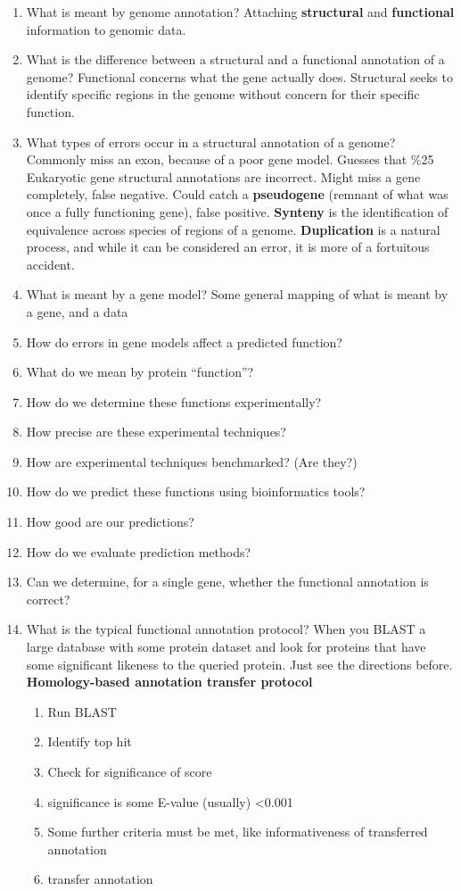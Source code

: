 \documentclass[11pt]{article}
\begin{document}
\begin{enumerate}
\item What is meant by genome annotation?
Attaching {\bf structural} and {\bf functional} information to genomic data.

\item What is the difference between a structural and a functional annotation of a genome?
Functional concerns what the gene actually does. Structural seeks to identify 
specific regions in the genome without concern for their specific function.
 
\item What types of errors occur in a structural annotation of a genome?
Commonly miss an exon, because of a poor gene model. Guesses that \%25 Eukaryotic gene 
structural annotations are incorrect. Might miss a gene completely, false negative. 
Could catch a {\bf pseudogene} (remnant of what was once a fully functioning gene), 
false positive. {\bf Synteny} is the identification
of equivalence across species of regions of a genome.
{\bf Duplication} is a natural process, and while it can be considered an error, 
it is more of a fortuitous accident.  

\item What is meant by a gene model?
Some general mapping of what is meant by a gene, and a data

\item How do errors in gene models affect a predicted function?
\item What do we mean by protein ``function''?
\item How do we determine these functions experimentally?
\item How precise are these experimental techniques?
\item How are experimental techniques benchmarked? (Are they?)
\item How do we predict these functions using bioinformatics tools?
\item How good are our predictions?
\item How do we evaluate prediction methods?
\item Can we determine, for a single gene, whether the functional annotation is correct?

\item What is the typical functional annotation protocol? 
When you BLAST a large database with some protein dataset and look
for proteins that have some significant likeness to the queried protein.
Just see the directions before.  
{\bf Homology-based  annotation transfer protocol}
\begin{enumerate}
  \item Run BLAST
  \item Identify top hit
  \item Check for significance of score
  \item significance is some E-value (usually) <0.001 
  \item Some further criteria must be met, like informativeness of transferred annotation
  \item transfer annotation
\end{enumerate}


\end{enumerate}
\end{document}
